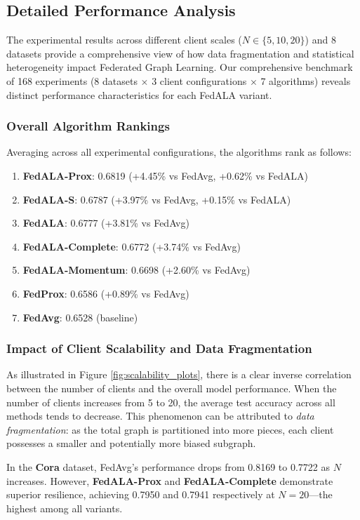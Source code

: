 \documentclass[10pt,conference,compsocconf,letterpaper]{IEEEtran}
\begin{document}
\subsection{Detailed Performance Analysis}

The experimental results across different client scales ($N \in \{5, 10, 20\}$) and 8 datasets provide a comprehensive view of how data fragmentation and statistical heterogeneity impact Federated Graph Learning. Our comprehensive benchmark of 168 experiments (8 datasets $\times$ 3 client configurations $\times$ 7 algorithms) reveals distinct performance characteristics for each FedALA variant.

\subsubsection{Overall Algorithm Rankings}
Averaging across all experimental configurations, the algorithms rank as follows:
\begin{enumerate}
    \item \textbf{FedALA-Prox}: 0.6819 (+4.45\% vs FedAvg, +0.62\% vs FedALA)
    \item \textbf{FedALA-S}: 0.6787 (+3.97\% vs FedAvg, +0.15\% vs FedALA)
    \item \textbf{FedALA}: 0.6777 (+3.81\% vs FedAvg)
    \item \textbf{FedALA-Complete}: 0.6772 (+3.74\% vs FedAvg)
    \item \textbf{FedALA-Momentum}: 0.6698 (+2.60\% vs FedAvg)
    \item \textbf{FedProx}: 0.6586 (+0.89\% vs FedAvg)
    \item \textbf{FedAvg}: 0.6528 (baseline)
\end{enumerate}

\subsubsection{Impact of Client Scalability and Data Fragmentation}
As illustrated in Figure \ref{fig:scalability_plots}, there is a clear inverse correlation between the number of clients and the overall model performance. When the number of clients increases from 5 to 20, the average test accuracy across all methods tends to decrease. This phenomenon can be attributed to \textit{data fragmentation}: as the total graph is partitioned into more pieces, each client possesses a smaller and potentially more biased subgraph.

In the \textbf{Cora} dataset, FedAvg's performance drops from 0.8169 to 0.7722 as $N$ increases. However, \textbf{FedALA-Prox} and \textbf{FedALA-Complete} demonstrate superior resilience, achieving 0.7950 and 0.7941 respectively at $N=20$---the highest among all variants.
\end{document}
